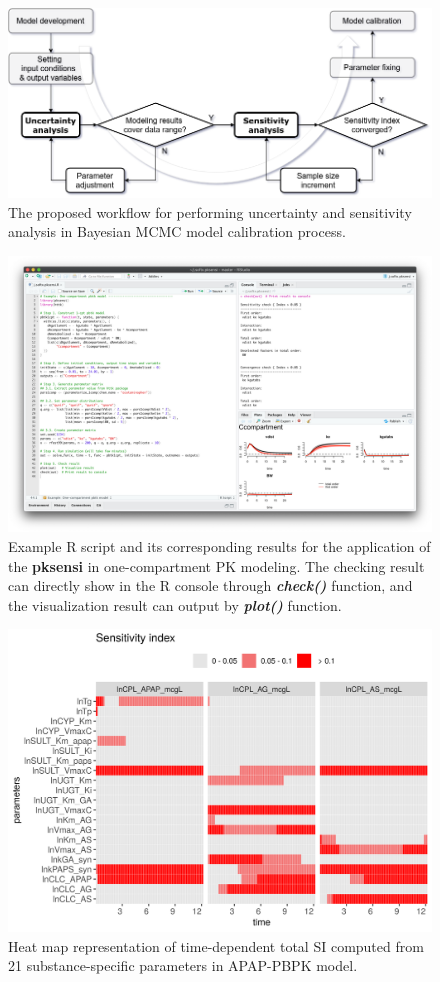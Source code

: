 \documentclass[preprint,12pt, a4paper]{elsarticle}
\begin{document}
\begin{figure}
\includegraphics[width=1\linewidth]{workflow} 
\caption{The proposed workflow for performing uncertainty and sensitivity analysis in Bayesian MCMC model calibration process.}
\label{fig:workflow}
\end{figure}

\clearpage
\newpage

\begin{figure}
\includegraphics[width=1\linewidth]{example-1} 
\caption{Example R script and its corresponding results for the application of the \textbf{pksensi} in one-compartment PK modeling. The checking result can directly show in the R console through \textit{\textbf{check()}} function, and the visualization result can output by \textit{\textbf{plot()}} function.}
\label{fig:example-1}
\end{figure}

\clearpage
\newpage

\begin{figure}
\includegraphics[width=1\linewidth]{example-2} 
\caption{Heat map representation of time-dependent total SI computed from 21 substance-specific parameters in APAP-PBPK model.}
\label{fig:example-2}
\end{figure}
\end{document}

